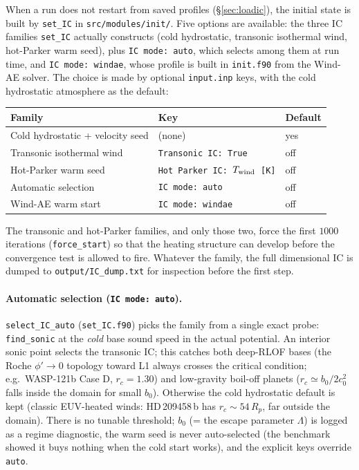 \documentclass[english,a4paper]{my_memo}
\begin{document}
When a run does not restart from saved profiles
(\S\ref{sec:loadic}), the initial state is built by \texttt{set\_IC}
in \texttt{src/modules/init/}. Five options are available: the three IC
families \texttt{set\_IC} actually constructs (cold hydrostatic, transonic
isothermal wind, hot-Parker warm seed), plus \texttt{IC mode: auto}, which
selects among them at run time, and \texttt{IC mode: windae}, whose profile is
built in \texttt{init.f90} from the Wind-AE solver. The choice is made by
optional \texttt{input.inp} keys, with the cold hydrostatic atmosphere as the
default:

\begin{center}
\small
\begin{tabular}{@{}lll@{}}
\toprule
Family & Key & Default \\
\midrule
Cold hydrostatic + velocity seed & (none) & yes \\
Transonic isothermal wind & \texttt{Transonic IC: True} & off \\
Hot-Parker warm seed & \texttt{Hot Parker IC: $T_{\rm wind}$ [K]} & off \\
Automatic selection & \texttt{IC mode: auto} & off \\
Wind-AE warm start & \texttt{IC mode: windae} & off \\
\bottomrule
\end{tabular}
\end{center}

The transonic and hot-Parker families, and only those two, force the
first $1000$ iterations (\texttt{force\_start}) so that the heating structure
can develop before the convergence test is allowed to fire. Whatever the family,
the full dimensional IC is dumped to \texttt{output/IC\_dump.txt} for
inspection before the first step.

\paragraph{Automatic selection (\texttt{IC mode: auto}).}
\texttt{select\_IC\_auto} (\texttt{set\_IC.f90}) picks the family from a
single exact probe: \texttt{find\_sonic} at the \emph{cold} base
sound speed in the actual potential. An interior sonic point selects
the transonic IC; this catches both deep-RLOF bases (the Roche
$\phi'\to0$ topology toward L1 always crosses the critical condition;
e.g.\ WASP-121b Case D, $r_c=1.30$) and low-gravity boil-off planets
($r_c \simeq b_0/2c_0^2$ falls inside the domain for small $b_0$).
Otherwise the cold hydrostatic default is kept (classic EUV-heated
winds: HD\,209458\,b has $r_c\sim54\,R_p$, far outside the domain).
There is no tunable threshold; $b_0$ (= the escape parameter $\Lambda$)
is logged as a regime diagnostic, the warm seed is never auto-selected
(the benchmark showed it buys nothing when the cold start works), and
the explicit keys override \texttt{auto}.
\end{document}
